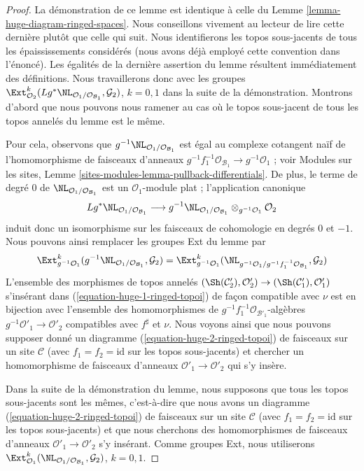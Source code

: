 \begin{proof}
La démonstration de ce lemme est identique à celle du
Lemme \ref{lemma-huge-diagram-ringed-spaces}.
Nous conseillons vivement au lecteur de lire cette dernière plutôt que celle
qui suit. Nous identifierons les topos sous-jacents de tous les
épaississements considérés (nous avons déjà employé cette convention dans
l'énoncé). Les égalités de la dernière assertion du lemme résultent
immédiatement des définitions. Nous travaillerons donc avec les groupes
$\Ext^k_{\mathcal{O}_2}(
Lg^*\NL_{\mathcal{O}_1/\mathcal{O}_{\mathcal{B}_1}}, \mathcal{G}_2)$,
$k = 0, 1$ dans la suite de la démonstration. Montrons d'abord que nous pouvons
nous ramener au cas où le topos sous-jacent de tous les topos annelés du lemme
est le même.

\medskip\noindent
Pour cela, observons que
$g^{-1}\NL_{\mathcal{O}_1/\mathcal{O}_{\mathcal{B}_1}}$ est égal au complexe
cotangent naïf de l'homomorphisme de faisceaux d'anneaux
$g^{-1}f_1^{-1}\mathcal{O}_{\mathcal{B}_1} \to g^{-1}\mathcal{O}_1$ ; voir
Modules sur les sites,
Lemme \ref{sites-modules-lemma-pullback-differentials}.
De plus, le terme de degré $0$ de
$\NL_{\mathcal{O}_1/\mathcal{O}_{\mathcal{B}_1}}$ est un
$\mathcal{O}_1$-module plat ; l'application canonique
$$
Lg^*\NL_{\mathcal{O}_1/\mathcal{O}_{\mathcal{B}_1}}
\longrightarrow
g^{-1}\NL_{\mathcal{O}_1/\mathcal{O}_{\mathcal{B}_1}}
\otimes_{g^{-1}\mathcal{O}_1} \mathcal{O}_2
$$
induit donc un isomorphisme sur les faisceaux de cohomologie en degrés $0$ et
$-1$. Nous pouvons ainsi remplacer les groupes Ext du lemme par
$$
\Ext^k_{g^{-1}\mathcal{O}_1}(
g^{-1}\NL_{\mathcal{O}_1/\mathcal{O}_{\mathcal{B}_1}}, \mathcal{G}_2) =
\Ext^k_{g^{-1}\mathcal{O}_1}(
\NL_{g^{-1}\mathcal{O}_1/g^{-1}f_1^{-1}\mathcal{O}_{\mathcal{B}_1}},
\mathcal{G}_2)
$$
L'ensemble des morphismes de topos annelés
$(\Sh(\mathcal{C}'_2), \mathcal{O}'_2) \to
(\Sh(\mathcal{C}'_1), \mathcal{O}'_1)$ s'insérant dans
(\ref{equation-huge-1-ringed-topoi}) de façon compatible avec $\nu$ est en
bijection avec l'ensemble des homomorphismes de
$g^{-1}f_1^{-1}\mathcal{O}_{\mathcal{B}'_1}$-algèbres
$g^{-1}\mathcal{O}'_1 \to \mathcal{O}'_2$ compatibles avec $f^\sharp$ et
$\nu$. Nous voyons ainsi que nous pouvons supposer donné un diagramme
(\ref{equation-huge-2-ringed-topoi}) de faisceaux sur un site $\mathcal{C}$
(avec $f_1 = f_2 = \text{id}$ sur les topos sous-jacents) et chercher un
homomorphisme de faisceaux d'anneaux $\mathcal{O}'_1 \to \mathcal{O}'_2$ qui
s'y insère.

\medskip\noindent
Dans la suite de la démonstration du lemme, nous supposons que tous les topos
sous-jacents sont les mêmes, c'est-à-dire que nous avons un diagramme
(\ref{equation-huge-2-ringed-topoi}) de faisceaux sur un site $\mathcal{C}$
(avec $f_1 = f_2 = \text{id}$ sur les topos sous-jacents) et que nous cherchons
des homomorphismes de faisceaux d'anneaux
$\mathcal{O}'_1 \to \mathcal{O}'_2$ s'y insérant.
Comme groupes Ext, nous utiliserons
$\Ext^k_{\mathcal{O}_1}(
\NL_{\mathcal{O}_1/\mathcal{O}_{\mathcal{B}_1}}, \mathcal{G}_2)$,
$k = 0, 1$.


\end{proof}

